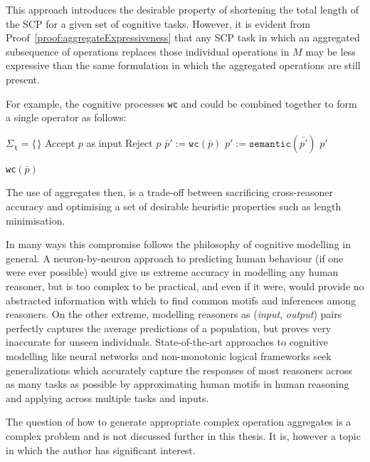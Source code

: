 This approach introduces the desirable property of shortening the total length of the SCP for a given set of cognitive tasks. However, it is evident from Proof~\ref{proof:aggregateExpressiveness} that any SCP task in which an aggregated subsequence of operations replaces those individual operations in $M$ may be less expressive than the same formulation in which the aggregated operations are still present.

For example, the cognitive processes \texttt{wc} and  could be combined together to form a single  operator as follows:

\begin{algorithm}[H] \label{cogOp:wc}
\SetAlgoLined
{}
{
$\Sigma_{\chi}=\{\}$\;
{
Accept $p$ as input\;
}
{
Reject $p$\;
}
}
{
$\bar{p}':=\texttt{wc}(\bar{p})$\;
$p':=\texttt{semantic}(\bar{p'})$\;
\Return $p'$
}

\caption{\texttt{wc}$(\bar{p})$}
\end{algorithm}

The use of aggregates then, is a trade-off between sacrificing cross-reasoner accuracy and optimising a set of desirable heuristic properties such as length minimisation.

In many ways this compromise follows the philosophy of cognitive modelling in general. A neuron-by-neuron approach to predicting human behaviour (if one were ever possible) would give us extreme accuracy in modelling any human reasoner, but is too complex to be practical, and even if it were, would provide no abstracted information with which to find common motifs and inferences among reasoners. On the other extreme, modelling reasoners as (\textit{input}, \textit{output}) pairs perfectly captures the average predictions of a population, but proves very inaccurate for unseen individuals. State-of-the-art approaches to cognitive modelling like neural networks and non-monotonic logical frameworks seek generalizations which accurately capture the responses of most reasoners across as many tasks as possible by approximating human motifs in human reasoning and applying across multiple tasks and inputs.

The question of how to generate appropriate complex operation aggregates is a complex problem and is not discussed further in this thesis. It is, however a topic in which the author has significant interest.



